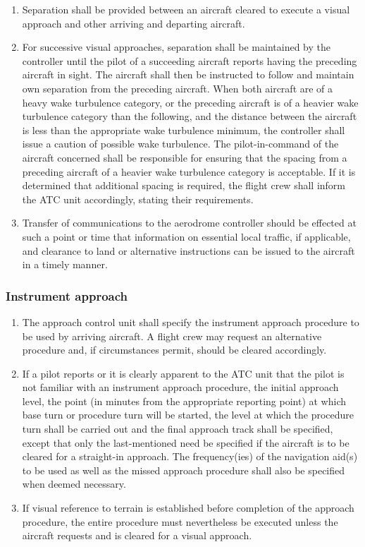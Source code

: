 \documentclass[../main.tex]{subfiles}
\begin{document}
\begin{enumerate}
        \item Separation shall be provided between an aircraft cleared to execute a visual approach and other arriving and departing aircraft.
        \item For successive visual approaches, separation shall be maintained by the controller until the pilot of a succeeding aircraft reports having the preceding aircraft in sight. The aircraft shall then be instructed to follow and maintain own separation from the preceding aircraft. When both aircraft are of a heavy wake turbulence category, or the preceding aircraft is of a heavier wake turbulence category than the following, and the distance between the aircraft is less than the appropriate wake turbulence minimum, the controller shall issue a caution of possible wake turbulence. The pilot-in-command of the aircraft concerned shall be responsible for ensuring that the spacing from a preceding aircraft of a heavier wake turbulence category is acceptable. If it is determined that additional spacing is required, the flight crew shall inform the ATC unit accordingly, stating their requirements.
        \item Transfer of communications to the aerodrome controller should be effected at such a point or time that information on essential local traffic, if applicable, and clearance to land or alternative instructions can be issued to the aircraft in a timely manner.
    \end{enumerate}

    \subsubsection{Instrument approach}

    \begin{enumerate}
        \item The approach control unit shall specify the instrument approach procedure to be used by arriving aircraft. A flight crew may request an alternative procedure and, if circumstances permit, should be cleared accordingly.
        \item If a pilot reports or it is clearly apparent to the ATC unit that the pilot is not familiar with an instrument approach procedure, the initial approach level, the point (in minutes from the appropriate reporting point) at which base turn or procedure turn will be started, the level at which the procedure turn shall be carried out and the final approach track shall be specified, except that only the last-mentioned need be specified if the aircraft is to be cleared for a straight-in approach. The frequency(ies) of the navigation aid(s) to be used as well as the missed approach procedure shall also be specified when deemed necessary.
        \item If visual reference to terrain is established before completion of the approach procedure, the entire procedure must nevertheless be executed unless the aircraft requests and is cleared for a visual approach.
    \end{enumerate}
\end{document}
